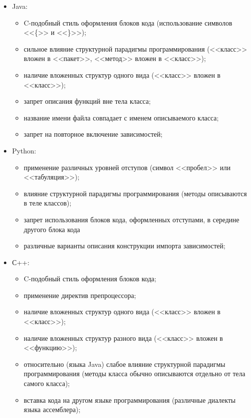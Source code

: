 \begin{itemize}[noitemsep]
  \item Java:
    \begin{itemize}[noitemsep]
      \item C-подобный стиль оформления блоков кода (использование символов <<\{>> и <<\}>>);
      \item сильное влияние структурной парадигмы программирования (<<класс>> вложен в <<пакет>>, <<метод>> вложен в <<класс>>);
      \item наличие вложенных структур одного вида (<<класс>> вложен в <<класс>>);
      \item запрет описания функций вне тела класса;
      \item название имени файла совпадает с именем описываемого класса;
      \item запрет на повторное включение зависимостей;
    \end{itemize}

  \item Python:
    \begin{itemize}[noitemsep]
      \item применение различных уровней отступов (символ <<пробел>> или <<табуляция>>);
      \item влияние структурной парадигмы программирования (методы описываются в теле классов);
      \item запрет использования блоков кода, оформленных отступами, в середине другого блока кода
      \item различные варианты описания конструкции импорта зависимостей;
    \end{itemize}

  \item С++:
    \begin{itemize}[noitemsep]
      \item C-подобный стиль оформления блоков кода;
      \item применение директив препроцессора;
      \item наличие вложенных структур одного вида (<<класс>> вложен в <<класс>>);
      \item наличие вложенных структур разного вида (<<класс>> вложен в <<функцию>>);
      \item относительно (языка Java) слабое влияние структурной парадигмы программирования (методы класса обычно описываются отдельно от тела самого класса);
      \item вставка кода на другом языке программирования (различные диалекты языка ассемблера);
    \end{itemize}


\end{itemize}
